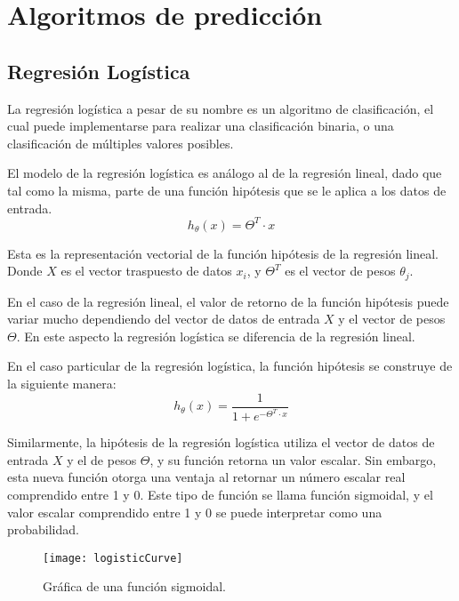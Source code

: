 
\section{Algoritmos de predicción} %
\label{sec:algoritmos_de_prediccion}

\subsection{Regresión Logística} %
\label{sub:regresion_logistica}

La regresión logística a pesar de su nombre es un algoritmo de clasificación, el cual puede implementarse para realizar una clasificación binaria, o una clasificación de múltiples valores posibles. 

El modelo de la regresión logística es análogo al de la regresión lineal, dado que tal como la misma, parte de una función hipótesis que se le aplica a los datos de entrada.
\begin{equation}
h_{\theta}(x)= \Theta^T \cdot x 
\end{equation}
\begin{small}
Esta es la representación vectorial de la función hipótesis de la regresión lineal. Donde $X$ es el vector traspuesto de datos $x_{i}$, y $\Theta^T$ es el vector de pesos $\theta_{j}$.
\end{small} \newline

En el caso de la regresión lineal, el valor de retorno de la función hipótesis puede variar mucho dependiendo del vector de datos de entrada $X$ y el vector de pesos $\Theta$. En este aspecto la regresión logística se diferencia de la regresión lineal.

En el caso particular de la regresión logística, la función hipótesis se construye de la siguiente manera:
\begin{equation}
h_{\theta}(x)= \frac{1}{1+e^{- \Theta^T\cdot x }} 
\end{equation}

Similarmente, la hipótesis de la regresión logística utiliza el vector de datos de entrada $X$ y el de pesos $\Theta$, y su función retorna un valor escalar. Sin embargo, esta nueva función otorga una ventaja al retornar un número escalar real comprendido entre 1 y 0. Este tipo de función se llama función sigmoidal, y el valor escalar comprendido entre 1 y 0 se puede interpretar como una probabilidad.
\begin{figure}[H]
\centering
\texttt{[image: logisticCurve]}
\caption{Gráfica de una función sigmoidal.}
\label{fig:logisticCurve}
\end{figure}

